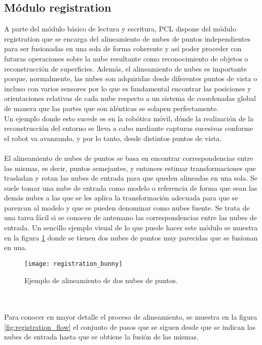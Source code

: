 \subsection{Módulo registration}\label{registration}
A parte del módulo básico de lectura y escritura, PCL dispone del módulo registration\cite{registration} que se encarga del alineamiento de nubes de puntos independientes para ser fusionadas en una sola de forma coherente y así poder proceder con futuras operaciones sobre la nube resultante como reconocimiento de objetos o reconstrucción de superficies. Además, el alineamiento de nubes es importante porque, normalmente, las nubes son adquiridas desde diferentes puntos de vista o incluso con varios sensores por lo que es fundamental encontrar las posiciones y orientaciones relativas de cada nube respecto a un sistema de coordenadas global de manera que las partes que son idénticas se solapen perfectamente. 
\\
Un ejemplo donde esto sucede es en la robótica móvil, dónde la realización de la reconstrucción del entorno se lleva a cabo mediante capturas sucesivas conforme el robot va avanzando, y por lo tanto, desde distintos puntos de vista.
\\
\\
El alineamiento de nubes de puntos se basa en encontrar correspondencias entre las mismas, es decir, puntos semejantes, y entonces estimar transformaciones que trasladan y rotan las nubes de entrada para que queden alineadas en una sola. Se suele tomar una nube de entrada como modelo o referencia de forma que sean las demás nubes a las que se les aplica la transformación adecuada para que se parezcan al modelo y que se pueden denominar como nubes fuente. Se trata de una tarea fácil si se conocen de antemano las correspondencias entre las nubes de entrada. Un sencillo ejemplo visual de lo que puede hacer este módulo se muestra en la figura \ref{fig:registration_bunny} donde se tienen dos nubes de puntos muy parecidas que se fusionan en una. 
\begin{figure}
\centering
\texttt{[image: registration\_bunny]}
\caption{Ejemplo de alineamiento de dos nubes de puntos.}\label{fig:registration_bunny}
\end{figure}
\\
\\
Para conocer en mayor detalle el proceso de alineamiento, se muestra en la figura \ref{fig:registration_flow} el conjunto de pasos que se siguen desde que se indican las nubes de entrada hasta que se obtiene la fusión de las mismas.

